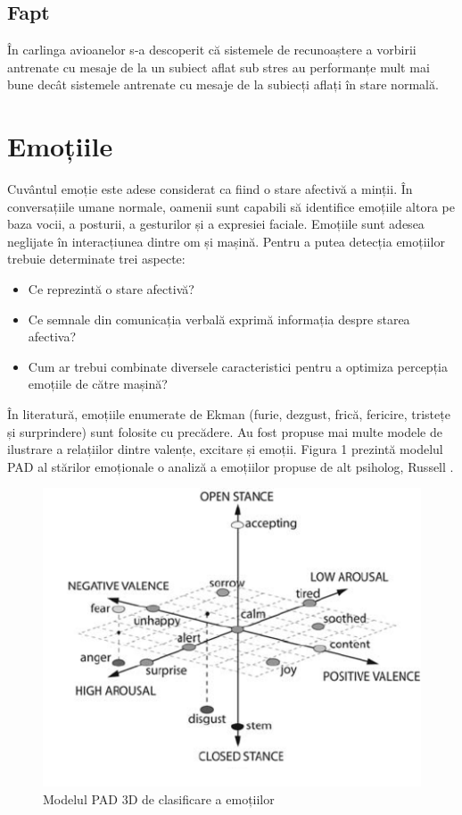 \documentclass[9pt,shortpaper,twoside,web]{ieeecolor}
\begin{document}
\subsection{Fapt}
În carlinga avioanelor s-a descoperit  că sistemele de recunoaștere a vorbirii antrenate cu mesaje de la un subiect aflat sub stres au performanțe mult mai bune decât sistemele antrenate cu mesaje de la subiecți aflați în stare normală.


\section{Emoțiile}
Cuvântul emoție este adese considerat ca fiind o stare afectivă a minții. În conversațiile umane normale, oamenii sunt capabili să identifice emoțiile altora pe baza vocii, a posturii, a gesturilor și a expresiei faciale. Emoțiile sunt adesea neglijate în interacțiunea dintre om și mașină. Pentru a putea detecția emoțiilor trebuie determinate trei aspecte:

\begin{itemize}
\item Ce reprezintă o stare afectivă?

\item Ce semnale din comunicația verbală exprimă informația despre starea afectiva?

\item Cum ar trebui combinate diversele caracteristici pentru a optimiza percepția emoțiile de către mașină?
\end{itemize}


În literatură, emoțiile enumerate de Ekman (furie, dezgust, frică, fericire, tristețe și surprindere) sunt folosite cu precădere. Au fost propuse mai multe modele de ilustrare a relațiilor dintre valențe, excitare și emoții. Figura 1 prezintă modelul PAD al stărilor emoționale o analiză a emoțiilor propuse de alt psiholog, Russell \cite{b5}.

\begin{figure}[htb]
\includegraphics[width=0.9\columnwidth]{res/fig/pad-model-3D}
\caption{Modelul PAD 3D de clasificare a emoțiilor \cite{b7}}
\label{fig1}
\end{figure}
\end{document}
